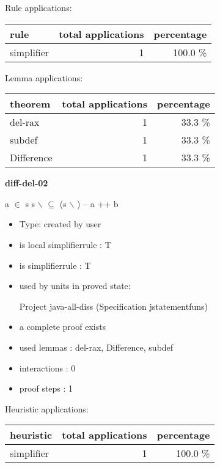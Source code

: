 \documentclass[a4paper]{article}
\begin{document}
Rule applications:

\begin{supertabular}{l|r|r}
rule	        & total applications & percentage \\ \hline
simplifier & 1 & 100.0 \% \\

\end{supertabular}

Lemma applications:

\begin{supertabular}{l|r|r}
theorem	        & total applications & percentage \\ \hline
del-rax & 1 & 33.3 \% \\
subdef & 1 & 33.3 \% \\
Difference & 1 & 33.3 \% \\

\end{supertabular}
\pagebreak

{\LARGE\bf diff-del-02}\label{lemma-diff-del-02}

\medskip

 \Fol \Not a $\in$ s \Imp s $\backslash$  $\subseteq$ (s $\backslash$ ) -- a ++ b

\begin{itemize}

\item Type: created by user

\item is local simplifierrule : T
\item is simplifierrule : T
\item used by units in proved state:

Project java-all-diss (Specification jstatementfuns)
\item       a complete proof exists
\item       used lemmas  : del-rax, Difference, subdef
\item       interactions : 0
\item       proof steps  : 1
\end{itemize}

\medskip


Heuristic applications:

\begin{supertabular}{l|r|r}
heuristic	& total applications & percentage \\ \hline
simplifier & 1 & 100.0 \% \\

\end{supertabular}
\end{document}
